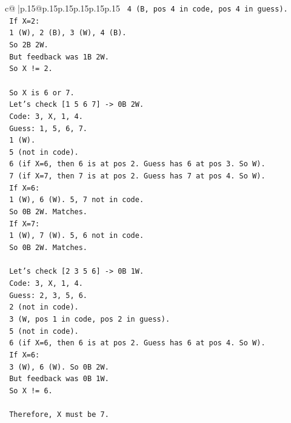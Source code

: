 \documentclass{article}
\begin{document}
{\begin{supertabular}{c@{$\;$}|p{.15\linewidth}@{}p{.15\linewidth}p{.15\linewidth}p{.15\linewidth}p{.15\linewidth}p{.15\linewidth}}
{{{\texttt{   4 (B, pos 4 in code, pos 4 in guess).} \\
\texttt{   If X=2:} \\
\texttt{   1 (W), 2 (B), 3 (W), 4 (B).} \\
\texttt{   So 2B 2W.} \\
\texttt{   But feedback was 1B 2W.} \\
\texttt{   So X != 2.} \\
\\ 
\texttt{   So X is 6 or 7.} \\
\texttt{   Let's check {[}1 5 6 7{]} {-}> 0B 2W.} \\
\texttt{   Code: 3, X, 1, 4.} \\
\texttt{   Guess: 1, 5, 6, 7.} \\
\texttt{   1 (W).} \\
\texttt{   5 (not in code).} \\
\texttt{   6 (if X=6, then 6 is at pos 2. Guess has 6 at pos 3. So W).} \\
\texttt{   7 (if X=7, then 7 is at pos 2. Guess has 7 at pos 4. So W).} \\
\texttt{   If X=6:} \\
\texttt{   1 (W), 6 (W). 5, 7 not in code.} \\
\texttt{   So 0B 2W. Matches.} \\
\texttt{   If X=7:} \\
\texttt{   1 (W), 7 (W). 5, 6 not in code.} \\
\texttt{   So 0B 2W. Matches.} \\
\\ 
\texttt{   Let's check {[}2 3 5 6{]} {-}> 0B 1W.} \\
\texttt{   Code: 3, X, 1, 4.} \\
\texttt{   Guess: 2, 3, 5, 6.} \\
\texttt{   2 (not in code).} \\
\texttt{   3 (W, pos 1 in code, pos 2 in guess).} \\
\texttt{   5 (not in code).} \\
\texttt{   6 (if X=6, then 6 is at pos 2. Guess has 6 at pos 4. So W).} \\
\texttt{   If X=6:} \\
\texttt{   3 (W), 6 (W). So 0B 2W.} \\
\texttt{   But feedback was 0B 1W.} \\
\texttt{   So X != 6.} \\
\\ 
\texttt{   Therefore, X must be 7.} \\
}}}
\end{supertabular}}
\end{document}

